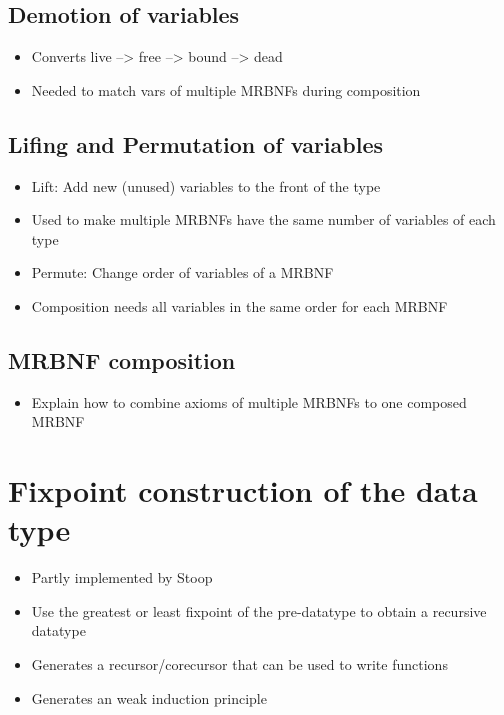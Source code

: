 \subsection{Demotion of variables}\label{sec:demote}

\begin{itemize}
\item{Converts live --> free --> bound --> dead}
\item{Needed to match vars of multiple MRBNFs during composition}
\end{itemize}

\subsection{Lifing and Permutation of variables}\label{sec:lift}

\begin{itemize}
\item{Lift: Add new (unused) variables to the front of the type}
\item{Used to make multiple MRBNFs have the same number of variables of each type}
\item{Permute: Change order of variables of a MRBNF}
\item{Composition needs all variables in the same order for each MRBNF}
\end{itemize}

\subsection{MRBNF composition}\label{sec:clean_composition}

\begin{itemize}
\item{Explain how to combine axioms of multiple MRBNFs to one composed MRBNF}
\end{itemize}

\section{Fixpoint construction of the data type}

\begin{itemize}
\item{Partly implemented by Stoop~\cite{mrbnf_fixpoint}}
\item{Use the greatest or least fixpoint of the pre-datatype to obtain a recursive datatype}
\item{Generates a recursor/corecursor that can be used to write functions}
\item{Generates an weak induction principle}
\end{itemize}
